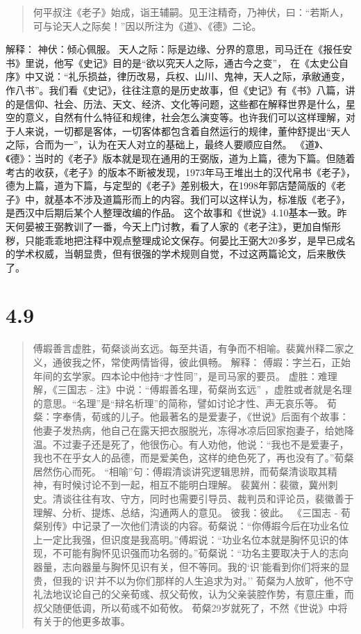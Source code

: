 \documentclass[]{book}
\begin{document}
\begin{quote}
何平叔注《老子》始成，诣王辅嗣。见王注精奇，乃神伏，曰：``若斯人，可与论天人之际矣！''因以所注为《道》、《德》二论。
\end{quote}

解释： 神伏：倾心佩服。
天人之际：际是边缘、分界的意思，司马迁在《报任安书》里说，他写《史记》目的是``欲以究天人之际，通古今之变''，
在《太史公自序》中又说：``礼乐损益，律历改易，兵权、山川、鬼神，天人之际，承敝通变，作八书''。我们看《史记》，往往注意的是历史故事，但《史记》有《书》八篇，讲的是信仰、社会、历法、天文、经济、文化等问题，这些都在解释世界是什么，星空的意义，自然有什么特征和规律，社会怎么演变等。也许我们可以这样理解，对于人来说，一切都是客体，一切客体都包含着自然运行的规律，董仲舒提出``天人之际，合而为一''，认为在天人对立的基础上，最终人要顺应自然。
《道》、《德》：当时的《老子》版本就是现在通用的王弼版，道为上篇，德为下篇。但随着考古的收获，《老子》的版本不断被发现，1973年马王堆出土的汉代帛书《老子》，德为上篇，道为下篇，与定型的《老子》差别极大，在1998年郭店楚简版的《老子》中，就基本不涉及道篇形而上的内容。我们可以这样认为，标准版《老子》，是西汉中后期后某个人整理改编的作品。
这个故事和《世说》4.10基本一致。昨天何晏被王弼教训了一番，今天上门讨教，看了人家的《老子注》，更加自惭形秽，只能乖乖地把注释中观点整理成论文保存。何晏比王弼大20多岁，是早已成名的学术权威，当朝显贵，但有很强的学术规则自觉，不过这两篇论文，后来散佚了。

\section{4.9}\label{section-188}

\begin{quote}
傅嘏善言虚胜，荀粲谈尚玄远。每至共语，有争而不相喻。裴冀州释二家之义，通彼我之怀，常使两情皆得，彼此俱畅。
解释：
傅嘏：字兰石，正始年间的玄学家。四本论中他持``才性同''，是司马家的要员。
虚胜：难理解，《三国志 - 注》中说：``傅嘏善名理，荀粲尚玄远''
，虚胜或者就是名理的意思。``名理''是``辩名析理''的简称，譬如讨论才性、声无哀乐等。
荀粲：字奉倩，荀彧的儿子。他最著名的是爱妻子，《世说》后面有个故事：他妻子发热病，他自己在露天把衣服脱光，冻得冰凉后回家抱妻子，给她降温。不过妻子还是死了，他很伤心。有人劝他，他说：``我也不是爱妻子，我也不在乎女人的品德，而是爱美色，这样的绝色死了，再也没有了。''荀粲居然伤心而死。
``相喻''句：傅嘏清谈讲究逻辑思辨，而荀粲清谈取其精神，有时候讨论不到一起，相互不能明白理解。
裴冀州：裴徽，冀州刺史。清谈往往有攻、守方，同时也需要引导员、裁判员和评论员，裴徽善于理解、分析、提炼、总结，沟通两人的意见。
彼我：彼此。 《三国志 -
荀粲别传》中记录了一次他们清谈的内容。荀粲说：``你傅嘏今后在功业名位上一定比我强，但识度是我高明。''傅嘏说：``功业名位本就是胸怀见识的体现，不可能有胸怀见识强而功名弱的。''荀粲说：``功名主要取决于人的志向器量，志向器量与胸怀见识有关，但不等同。我的`识'能看到你们将来的显贵，但我的`识'并不以为你们那样的人生追求为对。''
荀粲为人放旷，他不守礼法地议论自己的父亲荀彧、叔父荀攸，认为父亲装腔作势，有意庄重，而叔父随便低调，所以荀彧不如荀攸。
荀粲29岁就死了，不然《世说》中将有关于的他更多故事。
\end{quote}
\end{document}
